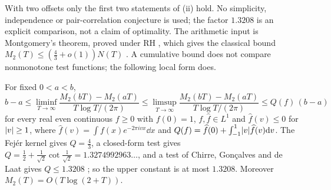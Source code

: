 With two offsets only the first two statements of (ii) hold. No simplicity, independence or
pair-correlation conjecture is used; the factor $1.3208$ is an explicit comparison, not a
claim of optimality. The arithmetic input is Montgomery's theorem, proved under RH
\cite{Montgomery1973Pair}, which gives the classical bound $M_2(T)\le(\tfrac43+o(1))N(T)$
\cite{ConreyGhoshGonek1998Simple}. A cumulative bound does not compare nonmonotone test
functions; the following local form does.

\begin{lemma}\label{zer:lem:localM2}
For fixed $0<a<b$,
\[
 b-a\le\liminf_{T\to\infty}\frac{M_2(bT)-M_2(aT)}{T\log T/(2\pi)}\le
 \limsup_{T\to\infty}\frac{M_2(bT)-M_2(aT)}{T\log T/(2\pi)}\le Q(f)\,(b-a)
\]
for every real even continuous $f\ge0$ with $f(0)=1$, $f,\widehat f\in L^1$ and $\widehat f(v)\le0$ for
$\lvert v\rvert\ge1$, where $\widehat f(v)=\int f(x)e^{-2\pi ivx}\dd x$ and
$Q(f)=\widehat f(0)+\int_{-1}^1\lvert v\rvert\widehat f(v)\mathrm{d} v$. The Fej\'er kernel gives $Q=\tfrac43$, a
closed-form test gives $Q=\tfrac12+\tfrac1{\sqrt2}\cot\tfrac1{\sqrt2}=1.3274992963\ldots$, and a test of
Chirre, Gon\c calves and de Laat gives $Q\le1.3208$ \cite{ChirreGoncalvesdeLaat2020Pair}; so the
upper constant is at most $1.3208$. Moreover $M_2(T)=O(T\log(2+T))$.
\end{lemma}
